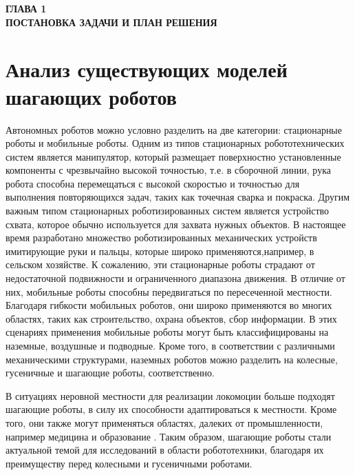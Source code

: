 

\newpage
\begin{center}
	\textbf{\large ГЛАВА 1 \\ ПОСТАНОВКА ЗАДАЧИ И ПЛАН РЕШЕНИЯ}
\end{center}


\section{Анализ существующих моделей шагающих роботов}

Автономных роботов можно условно разделить на две категории: стационарные роботы и мобильные роботы. Одним из типов стационарных робототехнических систем является манипулятор, который размещает поверхностно установленные компоненты с чрезвычайно высокой точностью\cite{bibl1}, т.е. в сборочной линии, рука робота способна перемещаться с высокой скоростью и точностью для выполнения повторяющихся задач, таких как точечная сварка\cite{welding} и покраска\cite{painting}. Другим важным типом стационарных роботизированных систем является устройство схвата\cite{grab}, которое обычно используется для захвата нужных объектов. В настоящее время разработано множество роботизированных механических устройств имитирующие руки и пальцы, которые широко применяются,например, в сельском хозяйстве\cite{farming}. К сожалению, эти стационарные роботы страдают от недостаточной подвижности и ограниченного диапазона движения. В отличие от них, мобильные роботы способны передвигаться по пересеченной местности. Благодаря гибкости мобильных роботов, они широко применяются во многих областях, таких как строительство, охрана объектов, сбор информации. В этих сценариях применения мобильные роботы могут быть классифицированы на наземные, воздушные и подводные. Кроме того, в соответствии с различными механическими структурами, наземных роботов можно разделить на колесные, гусеничные и шагающие роботы, соответственно.

В ситуациях неровной местности для реализации локомоции больше подходят шагающие роботы, в силу их способности адаптироваться к местности. Кроме того, они также могут применяться областях, далеких от промышленности, например медицина \cite{medicine1,medicine2} и образование \cite{edu}. Таким образом, шагающие роботы стали актуальной темой для исследований в области робототехники, благодаря их преимуществу перед колесными и гусеничными роботами.


